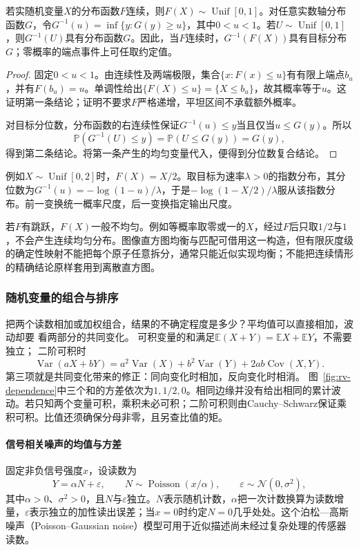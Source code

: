 \begin{theorem}[概率积分变换与逆分位数生成]
\label{prop:probability-integral-transform}
若实随机变量\(X\)的分布函数\(F\)连续，则\(F(X)\sim\operatorname{Unif}[0,1]\)。对任意实数轴分布函数\(G\)，令\(G^{-1}(u)=\inf\{y:G(y)\geq u\}\)，其中\(0<u<1\)。若\(U\sim\operatorname{Unif}[0,1]\)，则\(G^{-1}(U)\)具有分布函数\(G\)。因此，当\(F\)连续时，\(G^{-1}(F(X))\)具有目标分布\(G\)；零概率的端点事件上可任取约定值。
\end{theorem}

\begin{proof}
固定\(0<u<1\)。由连续性及两端极限，集合\(\{x:F(x)\leq u\}\)有有限上端点\(b_u\)，并有\(F(b_u)=u\)。单调性给出\(\{F(X)\leq u\}=\{X\leq b_u\}\)，故其概率等于\(u\)。这证明第一条结论；证明不要求\(F\)严格递增，平坦区间不承载额外概率。

对目标分位数，分布函数的右连续性保证\(G^{-1}(u)\leq y\)当且仅当\(u\leq G(y)\)。所以
\[
 \mathbb P(G^{-1}(U)\leq y)=\mathbb P(U\leq G(y))=G(y),
\]
得到第二条结论。将第一条产生的均匀变量代入，便得到分位数复合结论。
\end{proof}

例如\(X\sim\operatorname{Unif}[0,2]\)时，\(F(X)=X/2\)。取目标为速率\(\lambda>0\)的指数分布，其分位数为\(G^{-1}(u)=-\log(1-u)/\lambda\)，于是\(-\log(1-X/2)/\lambda\)服从该指数分布。前一变换统一概率尺度，后一变换指定输出尺度。

若\(F\)有跳跃，\(F(X)\)一般不均匀。例如等概率取零或一的\(X\)，经过\(F\)后只取\(1/2\)与\(1\)，不会产生连续均匀分布。图像直方图均衡与匹配可借用这一构造，但有限灰度级的确定性映射不能把每个原子任意拆分，通常只能近似实现均衡；不能把连续情形的精确结论原样套用到离散直方图。

\subsubsection{随机变量的组合与排序}
\label{sec:rv-combinations}
把两个读数相加或加权组合，结果的不确定程度是多少？平均值可以直接相加，波动却要
看两部分的共同变化。
可积变量的和满足\(\mathbb E(X+Y)=\mathbb EX+\mathbb EY\)，不需要独立；
二阶可积时
\[
\operatorname{Var}(aX+bY)
=a^2\operatorname{Var}(X)+b^2\operatorname{Var}(Y)
 +2ab\operatorname{Cov}(X,Y).
\]
第三项就是共同变化带来的修正：同向变化时相加，反向变化时相消。
图~\ref{fig:rv-dependence}中三个和的方差依次为\(1,1/2,0\)。相同边缘并没有给出相同的累计波动。若只知两个变量可积，乘积未必可积；二阶可积则由Cauchy--Schwarz保证乘积可积。比值还须确保分母非零，且另查比值的矩。

\paragraph{信号相关噪声的均值与方差}
固定非负信号强度\(x\)，设读数为
\[
 Y=\alpha N+\varepsilon,\qquad
 N\sim\operatorname{Poisson}(x/\alpha),\qquad
 \varepsilon\sim\mathcal N(0,\sigma^2),
\]
其中\(\alpha>0\)、\(\sigma^2>0\)，且\(N\)与\(\varepsilon\)独立。\(N\)表示随机计数，\(\alpha\)把一次计数换算为读数增量，\(\varepsilon\)表示独立的加性读出误差；当\(x=0\)时约定\(N=0\)几乎处处。这个泊松—高斯噪声（Poisson–Gaussian noise）模型可用于近似描述尚未经过复杂处理的传感器读数。

